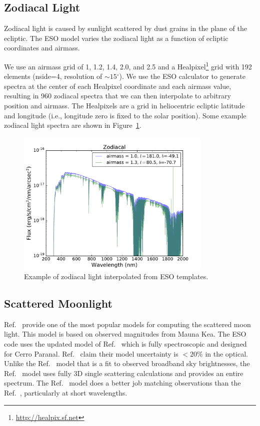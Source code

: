 \documentclass[]{spie}
\newcommand\degree{{^\circ}}
\begin{document}
\subsection{Zodiacal Light}

Zodiacal light is caused by sunlight scattered by dust grains in the plane of the ecliptic.  The ESO model varies the zodiacal light as a function of ecliptic coordinates and airmass.  

We use an airmass grid of 1, 1.2, 1.4, 2.0, and 2.5 and a Healpixel\footnote{\url{http://healpix.sf.net}} \cite{Gorski99} grid with 192 elements (nside=4, resolution of $\sim15\degree$).  We use the ESO calculator to generate spectra at the center of each Healpixel coordinate and each airmass value, resulting in 960 zodiacal spectra that we can then interpolate to arbitrary position and airmass.  The Healpixels are a grid in heliocentric ecliptic latitude and longitude (i.e., longitude zero is fixed to the solar position).  Some example zodiacal light spectra are shown in Figure~\ref{fig:zodiacal}. 


\begin{figure}[ht]
  \begin{center}
  \includegraphics[height=7cm]{plots/zodiacal.pdf}
  \end{center}
  \caption{Example of zodiacal light interpolated from ESO templates. \label{fig:zodiacal}}
\end{figure}


\subsection{Scattered Moonlight}

Ref.~ provide one of the most popular models for computing the scattered moon light. This model is based on observed magnitudes from Mauna Kea. The ESO code uses the updated model of Ref.~ which is fully spectroscopic and designed for Cerro Paranal. Ref.~ claim their model uncertainty is $<20$\% in the optical.  Unlike the Ref.~ model that is a fit to observed broadband sky brightnesses, the Ref.~ model uses fully 3D single scattering calculations and provides an entire spectrum. The Ref.~ model does a better job matching observations than the Ref.~, particularly at short wavelengths.
\end{document}
